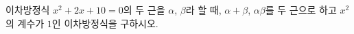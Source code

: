 이차방정식 $x^2+2x+10=0$의 두 근을 $\alpha$, $\beta$라 할 때, $\alpha+\beta$, $\alpha\beta$를 두 근으로 하고 $x^2$의 계수가 $1$인 이차방정식을 구하시오.
